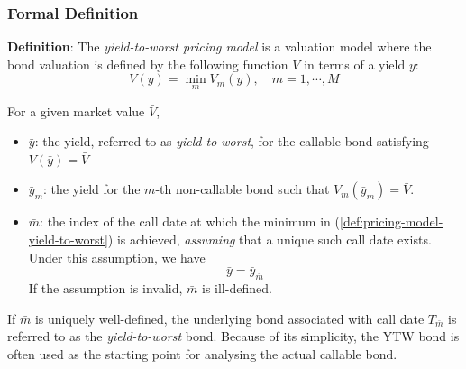 \documentclass[10pt,a4paper]{article}
\begin{document}
\subsubsection{Formal Definition}
\label{sec:ytw-formal-def}

{\bf Definition}: The {\em yield-to-worst pricing model} is a valuation model where the bond valuation is defined by the following function $V$ in terms of a yield $y$:
\begin{equation}
V(y) = \min_m V_m(y), \quad m = 1, \cdots, M
\label{def:pricing-model-yield-to-worst}
\end{equation}

For a given market value $\bar{V}$, 
\begin{itemize}
	\item $\bar{y}$: the yield, referred to as {\em yield-to-worst}, for the callable bond satisfying $V(\bar{y}) = \bar{V}$
	\item $\bar{y}_m$: the yield for the $m$-th non-callable bond such that $V_m(\bar{y}_m) = \bar{V}$.
	\item $\bar{m}$: the index of the call date at which the minimum in (\ref{def:pricing-model-yield-to-worst}) is achieved, {\em assuming} that a unique such call date exists. Under this assumption, we have
	\begin{equation}
	\bar{y} = \bar{y}_{\bar{m}}
	\end{equation}
	If the assumption is invalid, $\bar{m}$ is ill-defined. 
\end{itemize}

If $\bar{m}$ is uniquely well-defined, the underlying bond associated with call date $T_{\bar{m}}$ is referred to as the {\em yield-to-worst} bond. Because of its simplicity, the YTW bond is often used as the starting point for analysing the actual callable bond. 
\end{document}
